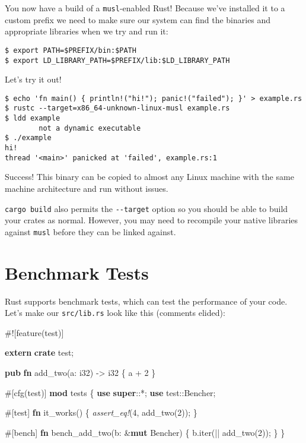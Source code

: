 \documentclass[a4paper,]{book}
\newenvironment{Shaded}{\begin{snugshade}}{\end{snugshade}}
\newcommand{\KeywordTok}[1]{\textcolor[rgb]{0.13,0.29,0.53}{\textbf{{#1}}}}
\newcommand{\DataTypeTok}[1]{\textcolor[rgb]{0.13,0.29,0.53}{{#1}}}
\newcommand{\DecValTok}[1]{\textcolor[rgb]{0.00,0.00,0.81}{{#1}}}
\newcommand{\PreprocessorTok}[1]{\textcolor[rgb]{0.56,0.35,0.01}{\textit{{#1}}}}
\newcommand{\AttributeTok}[1]{\textcolor[rgb]{0.77,0.63,0.00}{{#1}}}
\newcommand{\NormalTok}[1]{{#1}}
\begin{document}
You now have a build of a \texttt{musl}-enabled Rust! Because we've
installed it to a custom prefix we need to make sure our system can find
the binaries and appropriate libraries when we try and run it:

\begin{verbatim}
$ export PATH=$PREFIX/bin:$PATH
$ export LD_LIBRARY_PATH=$PREFIX/lib:$LD_LIBRARY_PATH
\end{verbatim}

Let's try it out!

\begin{verbatim}
$ echo 'fn main() { println!("hi!"); panic!("failed"); }' > example.rs
$ rustc --target=x86_64-unknown-linux-musl example.rs
$ ldd example
        not a dynamic executable
$ ./example
hi!
thread '<main>' panicked at 'failed', example.rs:1
\end{verbatim}

Success! This binary can be copied to almost any Linux machine with the
same machine architecture and run without issues.

\texttt{cargo\ build} also permits the \texttt{-\/-target} option so you
should be able to build your crates as normal. However, you may need to
recompile your native libraries against \texttt{musl} before they can be
linked against.

\section{Benchmark Tests}\label{sec--benchmark-tests}

Rust supports benchmark tests, which can test the performance of your
code. Let's make our \texttt{src/lib.rs} look like this (comments
elided):

\begin{Shaded}
\begin{Highlighting}[]
\AttributeTok{#![}\NormalTok{feature}\AttributeTok{(}\NormalTok{test}\AttributeTok{)]}

\KeywordTok{extern} \KeywordTok{crate} \NormalTok{test;}

\KeywordTok{pub} \KeywordTok{fn} \NormalTok{add_two(a: }\DataTypeTok{i32}\NormalTok{) -> }\DataTypeTok{i32} \NormalTok{\{}
    \NormalTok{a + }\DecValTok{2}
\NormalTok{\}}

\AttributeTok{#[}\NormalTok{cfg}\AttributeTok{(}\NormalTok{test}\AttributeTok{)]}
\KeywordTok{mod} \NormalTok{tests \{}
    \KeywordTok{use} \KeywordTok{super}\NormalTok{::*;}
    \KeywordTok{use} \NormalTok{test::Bencher;}

    \AttributeTok{#[}\NormalTok{test}\AttributeTok{]}
    \KeywordTok{fn} \NormalTok{it_works() \{}
        \PreprocessorTok{assert_eq!}\NormalTok{(}\DecValTok{4}\NormalTok{, add_two(}\DecValTok{2}\NormalTok{));}
    \NormalTok{\}}

    \AttributeTok{#[}\NormalTok{bench}\AttributeTok{]}
    \KeywordTok{fn} \NormalTok{bench_add_two(b: &}\KeywordTok{mut} \NormalTok{Bencher) \{}
        \NormalTok{b.iter(|| add_two(}\DecValTok{2}\NormalTok{));}
    \NormalTok{\}}
\NormalTok{\}}
\end{Highlighting}
\end{Shaded}
\end{document}
